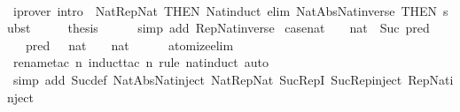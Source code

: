 \begin{isabellebody}
\ \ \ \ \isamarkupfalse%
\ {\isacharparenleft}{\kern0pt}iprover\ intro{\isacharcolon}{\kern0pt}\ \ Nat{\isacharunderscore}{\kern0pt}Rep{\isacharunderscore}{\kern0pt}Nat\ {\isacharbrackleft}{\kern0pt}THEN\ Nat{\isachardot}{\kern0pt}induct{\isacharbrackright}{\kern0pt}\ elim{\isacharcolon}{\kern0pt}\ Nat{\isacharunderscore}{\kern0pt}Abs{\isacharunderscore}{\kern0pt}Nat{\isacharunderscore}{\kern0pt}inverse\ {\isacharbrackleft}{\kern0pt}THEN\ subst{\isacharbrackright}{\kern0pt}{\isacharparenright}{\kern0pt}\isanewline
\ \ \isamarkupfalse%
\ \isamarkupfalse%
\ {\isacharquery}{\kern0pt}thesis\isanewline
\ \ \ \ \isamarkupfalse%
\ {\isacharparenleft}{\kern0pt}simp\ add{\isacharcolon}{\kern0pt}\ Rep{\isacharunderscore}{\kern0pt}Nat{\isacharunderscore}{\kern0pt}inverse{\isacharparenright}{\kern0pt}\isanewline
{}\isamarkupfalse%
%
\endisatagproof
{\isafoldproof}%
%
\isadelimproof
\isanewline
%
\endisadelimproof
\isanewline
{}\isamarkupfalse%
\ case{\isacharunderscore}{\kern0pt}nat\ \ {\isachardoublequoteopen}{}\ {\isacharcolon}{\kern0pt}{\isacharcolon}{\kern0pt}\ nat{\isachardoublequoteclose}\ {\isacharbar}{\kern0pt}\ Suc\ pred\isanewline
\ \ \ {\isachardoublequoteopen}pred\ {\isacharparenleft}{\kern0pt}{}\ {\isacharcolon}{\kern0pt}{\isacharcolon}{\kern0pt}\ nat{\isacharparenright}{\kern0pt}\ {\isacharequal}{\kern0pt}\ {\isacharparenleft}{\kern0pt}{}\ {\isacharcolon}{\kern0pt}{\isacharcolon}{\kern0pt}\ nat{\isacharparenright}{\kern0pt}{\isachardoublequoteclose}\isanewline
%
\isadelimproof
\ \ \ \ %
\endisadelimproof
%
\isatagproof
{}\isamarkupfalse%
\ atomize{\isacharunderscore}{\kern0pt}elim\isanewline
\ \ \ \ \isamarkupfalse%
\ {\isacharparenleft}{\kern0pt}rename{\isacharunderscore}{\kern0pt}tac\ n{\isacharcomma}{\kern0pt}\ induct{\isacharunderscore}{\kern0pt}tac\ n\ rule{\isacharcolon}{\kern0pt}\ nat{\isacharunderscore}{\kern0pt}induct{}{\isacharcomma}{\kern0pt}\ auto{\isacharparenright}{\kern0pt}\isanewline
\ \ \ \isamarkupfalse%
\ {\isacharparenleft}{\kern0pt}simp\ add{\isacharcolon}{\kern0pt}\ Suc{\isacharunderscore}{\kern0pt}def\ Nat{\isacharunderscore}{\kern0pt}Abs{\isacharunderscore}{\kern0pt}Nat{\isacharunderscore}{\kern0pt}inject\ Nat{\isacharunderscore}{\kern0pt}Rep{\isacharunderscore}{\kern0pt}Nat\ Suc{\isacharunderscore}{\kern0pt}RepI\ Suc{\isacharunderscore}{\kern0pt}Rep{\isacharunderscore}{\kern0pt}inject{\isacharprime}{\kern0pt}\ Rep{\isacharunderscore}{\kern0pt}Nat{\isacharunderscore}{\kern0pt}inject{\isacharparenright}{\kern0pt}\isanewline

\end{isabellebody}
